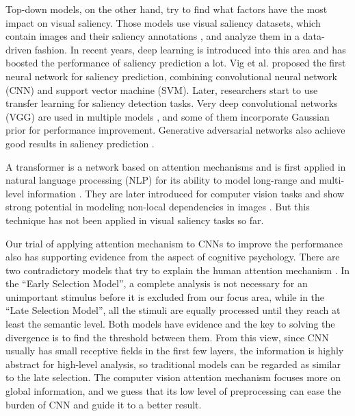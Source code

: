 \documentclass[12pt]{article}
\begin{document}
Top-down models, on the other hand, try to find what factors have the most impact on visual saliency. Those models use visual saliency datasets, which contain images and their saliency annotations
, and analyze them in a data-driven fashion.
In recent years, deep learning is introduced into this area and has boosted the performance of saliency prediction a lot.
Vig et al. \cite{vigLargeScaleOptimizationHierarchical2014} proposed the first neural network for saliency prediction, combining convolutional neural network (CNN) and support vector machine (SVM). Later, researchers start to use transfer learning for saliency detection tasks. Very deep convolutional networks (VGG) are used in multiple models \cite{kruthiventiDeepFixFullyConvolutional2015, kummererDeepGazeIIReading2016, corniaPredictingHumanEye2018}, and some of them incorporate Gaussian prior for performance improvement.
Generative adversarial networks also achieve good results in saliency prediction \cite{panSalGANVisualSaliency2018, cheHowGazeInfluenced2020}.

A transformer is a network based on attention mechanisms and is first applied in natural language processing (NLP) for its ability to model long-range and multi-level information \cite{bahdanauNeuralMachineTranslation2016a, vaswaniAttentionAllYou2017a}.
They are later introduced for computer vision tasks and show strong potential in modeling non-local dependencies in images \cite{zhangSelfAttentionGenerativeAdversarial2019a}.
But this technique has not been applied in visual saliency tasks so far.

Our trial of applying attention mechanism to CNNs to improve the performance also has supporting evidence from the aspect of cognitive psychology. There are two contradictory models that try to explain the human attention mechanism \cite{gazzaniga2006cognitive}.
In the “Early Selection Model”, a complete analysis is not necessary for an unimportant stimulus before it is excluded from our focus area, while in the “Late Selection Model”, all the stimuli are equally processed until they reach at least the semantic level.
Both models have evidence and the key to solving the divergence is to find the threshold between them. From this view, since CNN usually has small receptive fields in the first few layers, the information is highly abstract for high-level analysis, so traditional models can be regarded as similar to the late selection.
The computer vision attention mechanism focuses more on global information, and we guess that its low level of preprocessing can ease the burden of CNN and guide it to a better result.
\end{document}
